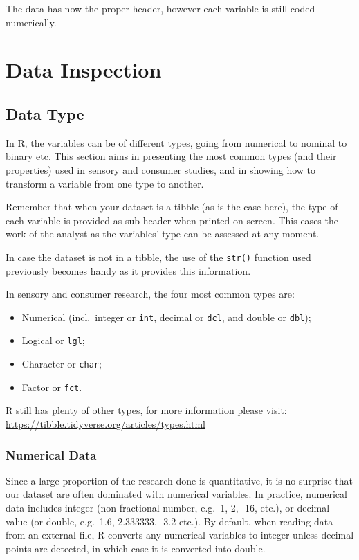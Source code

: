 \documentclass[
]{book}
\providecommand{\tightlist}{%
  \setlength{\itemsep}{0pt}\setlength{\parskip}{0pt}}
\begin{document}
The data has now the proper header, however each variable is still coded numerically.

\hypertarget{data-inspection}{%
\section{Data Inspection}\label{data-inspection}}

\hypertarget{data-type}{%
\subsection{Data Type}\label{data-type}}

In R, the variables can be of different types, going from numerical to nominal to binary etc. This section aims in presenting the most common types (and their properties) used in sensory and consumer studies, and in showing how to transform a variable from one type to another.

Remember that when your dataset is a tibble (as is the case here), the type of each variable is provided as sub-header when printed on screen. This eases the work of the analyst as the variables' type can be assessed at any moment.

In case the dataset is not in a tibble, the use of the \texttt{str()} function used previously becomes handy as it provides this information.

In sensory and consumer research, the four most common types are:

\begin{itemize}
\tightlist
\item
  Numerical (incl.~integer or \texttt{int}, decimal or \texttt{dcl}, and double or \texttt{dbl});
\item
  Logical or \texttt{lgl};
\item
  Character or \texttt{char};
\item
  Factor or \texttt{fct}.
\end{itemize}

R still has plenty of other types, for more information please visit: \url{https://tibble.tidyverse.org/articles/types.html}

\hypertarget{numerical-data}{%
\subsubsection{Numerical Data}\label{numerical-data}}

Since a large proportion of the research done is quantitative, it is no surprise that our dataset are often dominated with numerical variables. In practice, numerical data includes integer (non-fractional number, e.g.~1, 2, -16, etc.), or decimal value (or double, e.g.~1.6, 2.333333, -3.2 etc.).
By default, when reading data from an external file, R converts any numerical variables to integer unless decimal points are detected, in which case it is converted into double.
\end{document}
